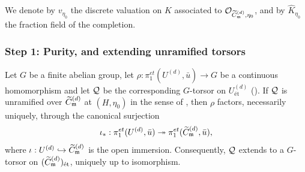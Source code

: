 We denote by $v_{\eta_0}$ the discrete valuation on $K$ associated to $\mathcal{O}_{\widetilde{C}_{\mathfrak{m}}^{(d)}, \eta_0}$,
and by $\widehat{K}_{\eta_0}$ the fraction field of the completion.

\subsubsection*{Step 1: Purity, and extending unramified torsors}

\begin{prop}\label{prop:extension_via_purity_r2}
    Let $G$ be a finite abelian group, let $\rho : \pi_1^{et}(U^{(d)}, \bar{u}) \to G$ be a continuous
    homomorphism and let $\mathcal{Q}$ be the corresponding $G$-torsor on $U^{(d)}_{\text{\'et}}$
    ().
    If $\mathcal{Q}$ is unramified over $\widetilde{C}_{\mathfrak{m}}^{(d)}$ at $(H, \eta_0)$ in the sense of
    , then $\rho$ factors, necessarily uniquely, through the
    canonical surjection
    \[ \iota_* : \pi_1^{et}(U^{(d)}, \bar{u}) \twoheadrightarrow \pi_1^{et}(\widetilde{C}_{\mathfrak{m}}^{(d)}, \bar{u}), \]
    where $\iota : U^{(d)} \hookrightarrow \widetilde{C}_{\mathfrak{m}}^{(d)}$ is the open immersion.
    Consequently, $\mathcal{Q}$ extends to a $G$-torsor on $(\widetilde{C}_{\mathfrak{m}}^{(d)})_{\text{\'et}}$, uniquely up to isomorphism.
\end{prop}
